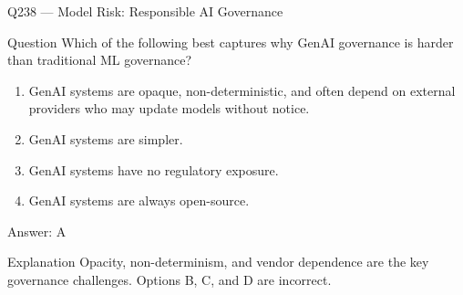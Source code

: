 \documentclass[aspectratio=169,8pt]{beamer}
\begin{document}
																																													\begin{frame}{Q238 --- Model Risk: Responsible AI Governance}
																																														\begin{block}{Question}
																																															Which of the following best captures why GenAI governance is harder than traditional ML governance?
																																															\begin{enumerate}
																																																\item GenAI systems are opaque, non-deterministic, and often depend on external providers who may update models without notice.
																																																\item GenAI systems are simpler.
																																																\item GenAI systems have no regulatory exposure.
																																																\item GenAI systems are always open-source.
																																															\end{enumerate}  \end{block}
																																															\begin{exampleblock}{Answer: A}\end{exampleblock}
																																															\begin{block}{Explanation}
																																																Opacity, non-determinism, and vendor dependence are the key governance challenges. Options B, C, and D are incorrect.
																																															\end{block}
																																														\end{frame}
																																														
\end{document}
